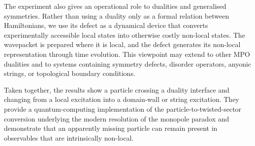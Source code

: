 \documentclass[aps,floatfix,10pt,amssymb,amsfont,amsmath,superscriptaddress,float,nofootinbib,longbibliography,nobalancelastpage,twocolumn]{revtex4-2}
\begin{document}
The experiment also gives an operational role to dualities and generalised symmetries. Rather than using a duality only as a formal relation between Hamiltonians, we use its defect as a dynamical device that converts experimentally accessible local states into otherwise costly non-local states. The wavepacket is prepared where it is local, and the defect generates its non-local representation through time evolution. This viewpoint may extend to other MPO dualities and to systems containing symmetry defects, disorder operators, anyonic strings, or topological boundary conditions.



Taken together, the results show a particle crossing a duality interface and changing from a local excitation into a domain-wall or string excitation. They provide a quantum-computing implementation of the particle-to-twisted-sector conversion underlying the modern resolution of the monopole paradox and demonstrate that an apparently missing particle can remain present in observables that are intrinsically non-local.

\end{document}
